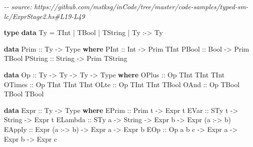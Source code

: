 \documentclass[]{article}
\newenvironment{Shaded}{}{}
\newcommand{\CommentTok}[1]{\textcolor[rgb]{0.38,0.63,0.69}{\textit{#1}}}
\newcommand{\DataTypeTok}[1]{\textcolor[rgb]{0.56,0.13,0.00}{#1}}
\newcommand{\KeywordTok}[1]{\textcolor[rgb]{0.00,0.44,0.13}{\textbf{#1}}}
\newcommand{\NormalTok}[1]{#1}
\newcommand{\OperatorTok}[1]{\textcolor[rgb]{0.40,0.40,0.40}{#1}}
\newcommand{\OtherTok}[1]{\textcolor[rgb]{0.00,0.44,0.13}{#1}}
\begin{document}
\begin{Shaded}
\begin{Highlighting}[]
\CommentTok{{-}{-} source: https://github.com/mstksg/inCode/tree/master/code{-}samples/typed{-}sm{-}lc/ExprStage2.hs\#L19{-}L49}

\KeywordTok{type} \KeywordTok{data} \DataTypeTok{Ty}
  \OtherTok{=} \DataTypeTok{TInt}
  \OperatorTok{|} \DataTypeTok{TBool}
  \OperatorTok{|} \DataTypeTok{TString}
  \OperatorTok{|} \DataTypeTok{Ty} \OperatorTok{:{-}\textgreater{}} \DataTypeTok{Ty}

\KeywordTok{data} \DataTypeTok{Prim}\OtherTok{ ::} \DataTypeTok{Ty} \OtherTok{{-}\textgreater{}} \DataTypeTok{Type} \KeywordTok{where}
  \DataTypeTok{PInt}\OtherTok{ ::} \DataTypeTok{Int} \OtherTok{{-}\textgreater{}} \DataTypeTok{Prim} \DataTypeTok{TInt}
  \DataTypeTok{PBool}\OtherTok{ ::} \DataTypeTok{Bool} \OtherTok{{-}\textgreater{}} \DataTypeTok{Prim} \DataTypeTok{TBool}
  \DataTypeTok{PString}\OtherTok{ ::} \DataTypeTok{String} \OtherTok{{-}\textgreater{}} \DataTypeTok{Prim} \DataTypeTok{TString}

\KeywordTok{data} \DataTypeTok{Op}\OtherTok{ ::} \DataTypeTok{Ty} \OtherTok{{-}\textgreater{}} \DataTypeTok{Ty} \OtherTok{{-}\textgreater{}} \DataTypeTok{Ty} \OtherTok{{-}\textgreater{}} \DataTypeTok{Type} \KeywordTok{where}
  \DataTypeTok{OPlus}\OtherTok{ ::} \DataTypeTok{Op} \DataTypeTok{TInt} \DataTypeTok{TInt} \DataTypeTok{TInt}
  \DataTypeTok{OTimes}\OtherTok{ ::} \DataTypeTok{Op} \DataTypeTok{TInt} \DataTypeTok{TInt} \DataTypeTok{TInt}
  \DataTypeTok{OLte}\OtherTok{ ::} \DataTypeTok{Op} \DataTypeTok{TInt} \DataTypeTok{TInt} \DataTypeTok{TBool}
  \DataTypeTok{OAnd}\OtherTok{ ::} \DataTypeTok{Op} \DataTypeTok{TBool} \DataTypeTok{TBool} \DataTypeTok{TBool}

\KeywordTok{data} \DataTypeTok{Expr}\OtherTok{ ::} \DataTypeTok{Ty} \OtherTok{{-}\textgreater{}} \DataTypeTok{Type} \KeywordTok{where}
  \DataTypeTok{EPrim}\OtherTok{ ::} \DataTypeTok{Prim}\NormalTok{ t }\OtherTok{{-}\textgreater{}} \DataTypeTok{Expr}\NormalTok{ t}
  \DataTypeTok{EVar}\OtherTok{ ::} \DataTypeTok{STy}\NormalTok{ t }\OtherTok{{-}\textgreater{}} \DataTypeTok{String} \OtherTok{{-}\textgreater{}} \DataTypeTok{Expr}\NormalTok{ t}
  \DataTypeTok{ELambda}\OtherTok{ ::} \DataTypeTok{STy}\NormalTok{ a }\OtherTok{{-}\textgreater{}} \DataTypeTok{String} \OtherTok{{-}\textgreater{}} \DataTypeTok{Expr}\NormalTok{ b }\OtherTok{{-}\textgreater{}} \DataTypeTok{Expr}\NormalTok{ (a }\OperatorTok{:{-}\textgreater{}}\NormalTok{ b)}
  \DataTypeTok{EApply}\OtherTok{ ::} \DataTypeTok{Expr}\NormalTok{ (a }\OperatorTok{:{-}\textgreater{}}\NormalTok{ b) }\OtherTok{{-}\textgreater{}} \DataTypeTok{Expr}\NormalTok{ a }\OtherTok{{-}\textgreater{}} \DataTypeTok{Expr}\NormalTok{ b}
  \DataTypeTok{EOp}\OtherTok{ ::} \DataTypeTok{Op}\NormalTok{ a b c }\OtherTok{{-}\textgreater{}} \DataTypeTok{Expr}\NormalTok{ a }\OtherTok{{-}\textgreater{}} \DataTypeTok{Expr}\NormalTok{ b }\OtherTok{{-}\textgreater{}} \DataTypeTok{Expr}\NormalTok{ c}
\end{Highlighting}
\end{Shaded}
\end{document}
